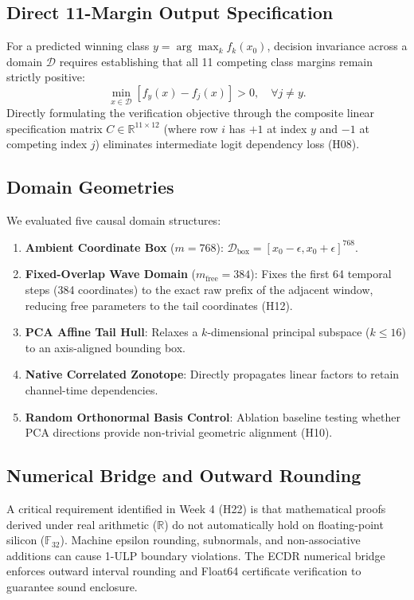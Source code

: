 \documentclass[10pt,twocolumn]{article}
\begin{document}
\subsection{Direct 11-Margin Output Specification}
For a predicted winning class $y = \arg\max_k f_k(x_0)$, decision invariance across a domain $\mathcal{D}$ requires establishing that all 11 competing class margins remain strictly positive:
\begin{equation}
\min_{x \in \mathcal{D}} \left[ f_y(x) - f_j(x) \right] > 0, \quad \forall j \neq y.
\end{equation}
Directly formulating the verification objective through the composite linear specification matrix $C \in \mathbb{R}^{11 \times 12}$ (where row $i$ has $+1$ at index $y$ and $-1$ at competing index $j$) eliminates intermediate logit dependency loss (H08).

\subsection{Domain Geometries}
We evaluated five causal domain structures:
\begin{enumerate}
    \item \textbf{Ambient Coordinate Box} ($m=768$): $\mathcal{D}_{\text{box}} = [x_0 - \epsilon, x_0 + \epsilon]^{768}$.
    \item \textbf{Fixed-Overlap Wave Domain} ($m_{\text{free}}=384$): Fixes the first 64 temporal steps (384 coordinates) to the exact raw prefix of the adjacent window, reducing free parameters to the tail coordinates (H12).
    \item \textbf{PCA Affine Tail Hull}: Relaxes a $k$-dimensional principal subspace ($k \le 16$) to an axis-aligned bounding box.
    \item \textbf{Native Correlated Zonotope}: Directly propagates linear factors to retain channel-time dependencies.
    \item \textbf{Random Orthonormal Basis Control}: Ablation baseline testing whether PCA directions provide non-trivial geometric alignment (H10).
\end{enumerate}

\subsection{Numerical Bridge and Outward Rounding}
A critical requirement identified in Week 4 (H22) is that mathematical proofs derived under real arithmetic ($\mathbb{R}$) do not automatically hold on floating-point silicon ($\mathbb{F}_{32}$). Machine epsilon rounding, subnormals, and non-associative additions can cause 1-ULP boundary violations. The ECDR numerical bridge enforces outward interval rounding and Float64 certificate verification to guarantee sound enclosure.
\end{document}
